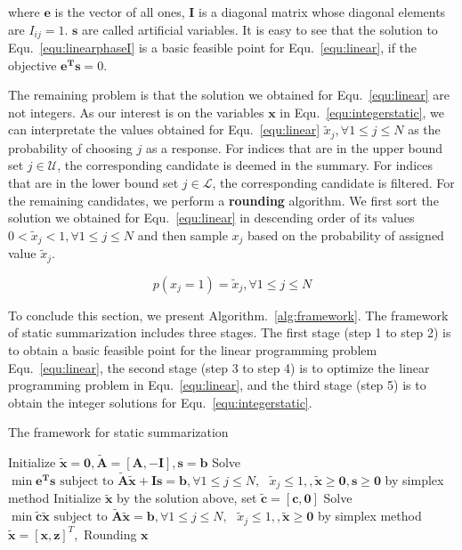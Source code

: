 \documentclass[envcountsame]{llncs}
\begin{document}
where $\mathbf{e}$ is the vector of all ones, $\mathbf{I}$ is a diagonal matrix whose diagonal elements are $I_{ij}=1$. $\mathbf{s}$ are called artificial variables. It is easy to see that the solution to Equ.~\ref{equ:linearphaseI} is a basic feasible point for Equ.~\ref{equ:linear}, if the objective $\mathbf{e^{T}s}=0 $.

The remaining problem is that the solution we obtained for Equ.~\ref{equ:linear} are not integers. As our interest is on the variables $\mathbf{x}$ in Equ.~\ref{equ:integerstatic}, we can interpretate the values obtained for Equ.~\ref{equ:linear} $\tilde{x}_j, \forall 1\leq j\leq N $ as the probability of choosing $j$ as a response. For indices that are in the upper bound set $j \in \mathcal{U}$, the corresponding candidate is deemed in the summary. For indices that are in the lower bound set $j \in \mathcal{L}$, the corresponding candidate is filtered. For the remaining candidates, we perform a \textbf{rounding} algorithm. We first sort the solution we obtained for Equ.~\ref{equ:linear} in descending order of its values $0< \tilde{x}_j< 1,\forall 1\leq j\leq N$ and then sample $x_j$ based on the probability of assigned value $\tilde{x}_j$.

\vspace{-0.3cm}
\begin{equation}
p(x_j=1)= \tilde{x}_j, \forall 1\leq j \leq N
\end{equation}
\vspace{-0.6cm}

To conclude this section, we present Algorithm.~\ref{alg:framework}. The framework of static summarization includes three stages. The first stage (step 1 to step 2) is to obtain a basic feasible point for the linear programming problem Equ.~\ref{equ:linear}, the second stage (step 3 to step 4) is to optimize the linear programming problem in Equ.~\ref{equ:linear}, and the third stage (step 5) is to obtain the integer solutions for Equ.~\ref{equ:integerstatic}.

\vspace{-0.6cm}
\begin{algorithm}\label{alg:framework}
\caption{The framework for static summarization}

Initialize $\tilde{\mathbf{x}}=\mathbf{0},\tilde{\mathbf{A}}=[\mathbf{A},-\mathbf{I}],\mathbf{s}=\mathbf{b}$\;
Solve $\min \mathbf{e^{T}s} \textrm{ subject to } \tilde{\mathbf{A}}\tilde{\mathbf{x}} + \mathbf{Is} = \mathbf{b},  \forall 1\leq j\leq N,\textrm{ } \tilde{x}_j \leq 1, ,\tilde{\mathbf{x}}\geq \mathbf{0}, \mathbf{s}\geq \mathbf{0}$ by simplex method\;
Initialize $\tilde{\mathbf{x}}$ by the solution above, set $\tilde{\mathbf{c}}=[\mathbf{c},\mathbf{0}]$  \;
Solve $\min \tilde{\mathbf{c}}\tilde{\mathbf{x}}\textrm{ subject to } \tilde{\mathbf{A}}\tilde{\mathbf{x}} = \mathbf{b}, \forall 1\leq j\leq N,\textrm{ } \tilde{x}_j \leq 1, ,\tilde{\mathbf{x}}\geq \mathbf{0}$ by simplex method\;
$\tilde{\mathbf{x}}=[\mathbf{x},\mathbf{z}]^T,$ Rounding $\mathbf{x}$\;
\end{algorithm}
\vspace{-0.8cm}
\end{document}
